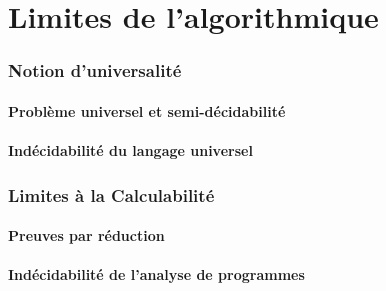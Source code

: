\documentclass[9pt]{beamer}
\begin{document}
 
\part{Limites de l'algorithmique}
 
 
\section{Notion d'universalité}
 
\subsection{Problème universel et semi-décidabilité}






 
\subsection{Indécidabilité du langage universel}





 
\section{Limites à la Calculabilité}
 
\subsection{Preuves par réduction}





 
\subsection{Indécidabilité de l'analyse de programmes}






 
\end{document}
